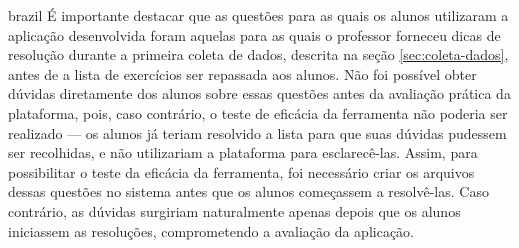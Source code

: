 \begin{otherlanguage*}{brazil}
É importante destacar que as questões para as quais os alunos utilizaram a aplicação desenvolvida foram aquelas para as quais o professor forneceu dicas de resolução durante a primeira coleta de dados, descrita na seção \ref{sec:coleta-dados}, antes de a lista de exercícios ser repassada aos alunos. Não foi possível obter dúvidas diretamente dos alunos sobre essas questões antes da avaliação prática da plataforma, pois, caso contrário, o teste de eficácia da ferramenta não poderia ser realizado — os alunos já teriam resolvido a lista para que suas dúvidas pudessem ser recolhidas, e não utilizariam a plataforma para esclarecê-las. Assim, para possibilitar o teste da eficácia da ferramenta, foi necessário criar os arquivos dessas questões no sistema antes que os alunos começassem a resolvê-las. Caso contrário, as dúvidas surgiriam naturalmente apenas depois que os alunos iniciassem as resoluções, comprometendo a avaliação da aplicação.

\end{otherlanguage*}

